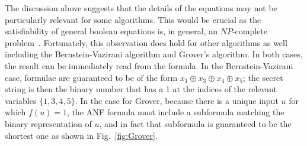 \documentclass{article}
\begin{document}
\begin{refsection}
The discussion above suggests that the details of the equations may
not be particularly relevant for some algorithms. This would be
crucial as the satisfiability of general boolean equations is, in
general, an $\mathit{NP}$-complete
problem~\cite{4640789,Karp1972,10.1145/800157.805047}. Fortunately,
this observation does hold for other algorithms as well including the
Bernstein-Vazirani algorithm and Grover's algorithm. In both cases,
the result can be immediately read from the formula. In the
Bernstein-Vazirani case, formulae are guaranteed to be of the form
$x_1 \oplus x_3 \oplus x_4 \oplus x_5$; the secret string is then the
binary number that has a 1 at the indices of the relevant variables
$\{ 1,3,4,5 \}$. In the case for Grover, because there is a unique
input $u$ for which $f(u) = 1$, the ANF formula must include a
subformula matching the binary representation of $u$, and in fact that
subformula is guaranteed to be the shortest one as shown in
Fig.~\ref{fig:Grover}.


\end{refsection}
\end{document}
